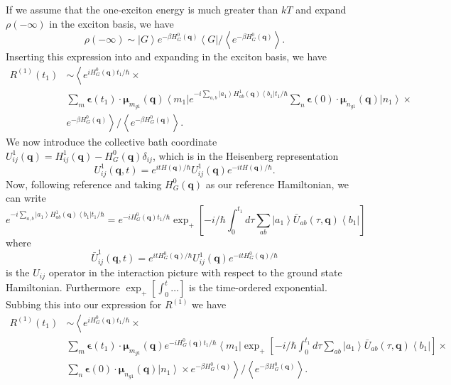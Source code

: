 \documentclass{article}
\newcommand{\bra}[1]{\ensuremath{\left\langle#1\right|}}
\newcommand{\ket}[1]{\ensuremath{\left|#1\right\rangle}}
\newcommand{\ensb}[1]{\left\langle#1\right\rangle}
\newcommand{\vect}[1]{\ensuremath{\boldsymbol{\mathbf{#1}}}}
\begin{document}
If we assume that the one-exciton energy is much greater than $kT$ and expand $\rho(-\infty)$ in the exciton basis, we have
\begin{equation}
\rho(-\infty)\sim \ket{G}e^{-\beta H_{G}^{0}(\vect{q})}\bra{G}/\ensb{e^{-\beta H_{G}^{0}(\vect{q})}}.
\end{equation}
Inserting this expression into  and expanding in the exciton basis, we have
\begin{equation}
\begin{split}
R^{(1)}(t_{1})&\sim
\left\langle e^{iH_{G}^{0}(\vect q)t_{1}/\hbar}\times\right. \\
&\sum_{m}\vect\epsilon(t_{1})\cdot\vect\mu_{m_{g1}}(\vect q)\bra{m_{1}}
e^{-i\sum_{a,b}\ket{a_{1}}H_{ab}^{1}(\vect q)\bra{b_{1}} t_{1}/\hbar}
\sum_{n}\vect\epsilon(0)\cdot\vect\mu_{n_{g1}}(\vect q)\ket{n_{1}}\times\\
&\left. e^{-\beta H_{G}^{0}(\vect{q})}\right\rangle/\ensb{e^{-\beta H_{G}^{0}(\vect{q})}}.
\end{split}
\end{equation}
We now introduce the collective bath coordinate $U_{ij}^{1}(\vect q)=H_{ij}^{1}(\vect q)-H_{G}^{0}(\vect q)\delta_{ij}$, which is in the Heisenberg representation
\begin{equation}
U_{ij}^{1}(\vect q, t)=e^{itH(\vect q)/\hbar}U_{ij}^{1}(\vect q)e^{-itH(\vect q)/\hbar}.
\end{equation}
Now, following reference  and taking $H_{G}^{0}(\vect q)$ as our reference Hamiltonian, we can write
\begin{equation}
e^{-i\sum_{a,b}\ket{a_{1}}H_{ab}^{1}(\vect q)\bra{b_{1}} t_{1}/\hbar}=e^{-iH_{G}^0(\vect q)t_{1}/\hbar}\exp_{+}\left[-i/\hbar\int_0^{t_1}d\tau\sum_{ab}\ket{a_{1}}\bar U_{ab}(\tau,\vect q) \bra{b_{1}}\right]
\end{equation}
where 
\begin{equation}
\bar{U}_{ij}^{1}(\vect q, t)=e^{itH_{G}^{0}(\vect q)/\hbar}U_{ij}^{1}(\vect q)e^{-itH_{G}^{0}(\vect q)/\hbar}
\end{equation}
is the $U_{ij}$ operator in the interaction picture with respect to the ground state Hamiltonian.
Furthermore $\exp_{+}{\left[\int_{0}^{t}\ldots \right]}$ is the time-ordered exponential.\cite{Mukamel1995}
Subbing this into our expression for $R^{(1)}$ we have
\begin{equation}
\begin{split}
R^{(1)}(t_{1})&\sim
\left\langle e^{iH_{G}^{0}(\vect q)t_{1}/\hbar}\times\right. \\
&\sum_{m}\vect\epsilon(t_{1})\cdot\vect\mu_{m_{g1}}(\vect q)e^{-iH_{G}^0(\vect q)t_{1}/\hbar}\bra{m_{1}}
\exp_{+}\left[-i/\hbar\int_0^{t_1}d\tau\sum_{ab}\ket{a_{1}}\bar U_{ab}(\tau,\vect q) \bra{b_{1}}\right]\times\\
&\sum_{n}\vect\epsilon(0)\cdot\vect\mu_{n_{g1}}(\vect q)\ket{n_{1}}\times
\left. e^{-\beta H_{G}^{0}(\vect{q})}\right\rangle/\ensb{e^{-\beta H_{G}^{0}(\vect{q})}}.
\end{split}
\end{equation}
\end{document}
